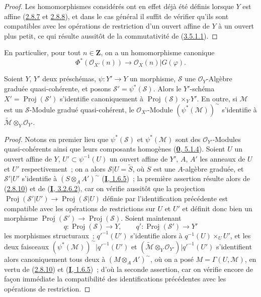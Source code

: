 \begin{proof}
Les homomorphismes considérés ont en effet déjà été définis lorsque $Y$ est
affine (\hyperref[II.2.8.7-fr]{2.8.7} et
\hyperref[II.2.8.8-fr]{2.8.8}), et dans le cas général il suffit de vérifier
qu'ils sont compatibles avec les opérations de restriction d'un ouvert
affine de $Y$ à un ouvert plus petit, ce qui résulte aussitôt de la
commutativité de (\hyperref[II.3.5.1.1-fr]{3.5.1.1}).
\end{proof}

En particulier, pour tout $n\in\mathbf{Z}$, on a un homomorphisme canonique
\[
\label{II.3.5.2.1-fr}
  \Phi^*(\mathcal{O}_{X'}(n))\longrightarrow
  \mathcal{O}_X(n)|G(\varphi).
\tag{3.5.2.1}
\]

\begin{proposition}[3.5.3]
\label{II.3.5.3-fr}
Soient $Y$, $Y'$ deux préschémas, $\psi:Y'\to Y$ un morphisme,
$\mathcal{S}$ une $\mathcal{O}_Y$-Algèbre graduée quasi-cohérente, et posons
$\mathcal{S}'=\psi^*(\mathcal{S})$. Alors le $Y'$-schéma
$X'=\operatorname{Proj}(\mathcal{S}')$ s'identifie canoniquement à
$\operatorname{Proj}(\mathcal{S})\times_Y Y'$. En outre, si $\mathcal{M}$ est
un $\mathcal{S}$-Module gradué quasi-cohérent, le $\mathcal{O}_{X'}$-Module
$(\psi^*(\mathcal{M}))^{\sim}$ s'identifie à
$\widetilde{\mathcal{M}}\otimes_Y\mathcal{O}_{Y'}$.
\end{proposition}

\begin{proof}
Notons en premier lieu que $\psi^*(\mathcal{S})$ et
$\psi^*(\mathcal{M})$ sont des $\mathcal{O}_{Y'}$-Modules quasi-cohérents
ainsi que leurs composants homogènes
(\hyperref[0.5.1.4-fr]{\textbf{0}, 5.1.4}). Soient $U$ un ouvert affine de $Y$,
$U'\subset\psi^{-1}(U)$ un ouvert affine de $Y'$, $A$, $A'$ les anneaux de
$U$ et $U'$ respectivement~; on a alors
$\mathcal{S}|U=\widetilde{S}$, où $S$ est une $A$-algèbre graduée, et
$\mathcal{S}'|U'$ s'identifie à $(S\otimes_A A')^{\sim}$
(\hyperref[I.1.6.5-fr]{\textbf{I}, 1.6.5})~; la première assertion résulte alors de
(\hyperref[II.2.8.10-fr]{2.8.10}) et de
(\hyperref[I.3.2.6.2-fr]{\textbf{I}, 3.2.6.2}), car on vérifie aussitôt que la
projection
$\operatorname{Proj}(\mathcal{S}'|U')\to
\operatorname{Proj}(\mathcal{S}|U)$ définie par l'identification précédente
est compatible avec les opérations de restrictions sur $U$ et $U'$ et
définit donc bien un morphisme
$\operatorname{Proj}(\mathcal{S}')\to\operatorname{Proj}(\mathcal{S})$.
Soient maintenant
\[
  q:\operatorname{Proj}(\mathcal{S})\to Y,
  \qquad q':\operatorname{Proj}(\mathcal{S}')\to Y'
\]
les morphismes structuraux~; $q'^{-1}(U')$ s'identifie alors à
$q^{-1}(U)\times_U U'$, et les deux faisceaux
$(\psi^*(\mathcal{M}))^{\sim}|q'^{-1}(U')$ et
$(\widetilde{\mathcal{M}}\otimes_Y\mathcal{O}_{Y'})|q'^{-1}(U')$
s'identifient alors canoniquement tous deux à $(M\otimes_A A')^{\sim}$, où
on a posé $M=\Gamma(U,\mathcal{M})$, en vertu de
(\hyperref[II.2.8.10-fr]{2.8.10}) et
(\hyperref[I.1.6.5-fr]{\textbf{I}, 1.6.5})~; d'où la seconde assertion, car on vérifie
encore de façon immédiate la compatibilité des identifications précédentes
avec les opérations de restriction.
\end{proof}

